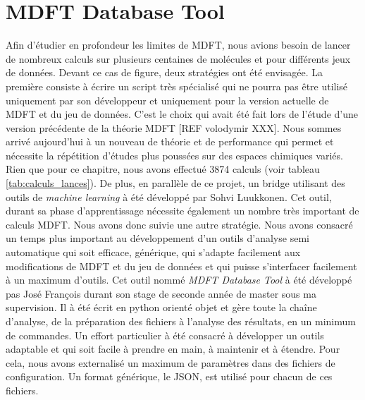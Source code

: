 \section{MDFT Database Tool}
Afin d'étudier en profondeur les limites de MDFT, nous avions besoin de lancer de nombreux calculs sur plusieurs centaines de molécules et pour différents jeux de données. Devant ce cas de figure, deux stratégies ont été envisagée. La première consiste à écrire un script très spécialisé qui ne pourra pas être utilisé uniquement par son développeur et uniquement pour la version actuelle de MDFT et du jeu de données. C'est le choix qui avait été fait lors de l'étude d'une version précédente de la théorie MDFT [REF volodymir XXX]. Nous sommes arrivé aujourd'hui à un nouveau de théorie et de performance qui permet et nécessite la répétition d'études plus poussées sur des espaces chimiques variés. Rien que pour ce chapitre, nous avons effectué 3874 calculs (voir tableau \ref{tab:calculs_lances}). De plus, en parallèle de ce projet, un bridge utilisant des outils de \textit{machine learning} à été développé par Sohvi Luukkonen. Cet outil, durant sa phase d'apprentissage nécessite également un nombre très important de calculs MDFT. Nous avons donc suivie une autre stratégie. Nous avons consacré un temps plus important au développement d'un outils d'analyse semi automatique qui soit efficace, générique, qui s'adapte facilement aux modifications de MDFT et du jeu de données et qui puisse s'interfacer facilement à un maximum d'outils. Cet outil nommé \textit{MDFT Database Tool} à été développé pas José François durant son stage de seconde année de master sous ma supervision. Il à été écrit en python orienté objet et gère toute la chaîne d'analyse, de la préparation des fichiers à l'analyse des résultats, en un minimum de commandes. Un effort particulier à été consacré à développer un outils adaptable et qui soit facile à prendre en main, à maintenir et à étendre. Pour cela, nous avons externalisé un maximum de paramètres dans des fichiers de configuration. Un format générique, le JSON, est utilisé pour chacun de ces fichiers.




